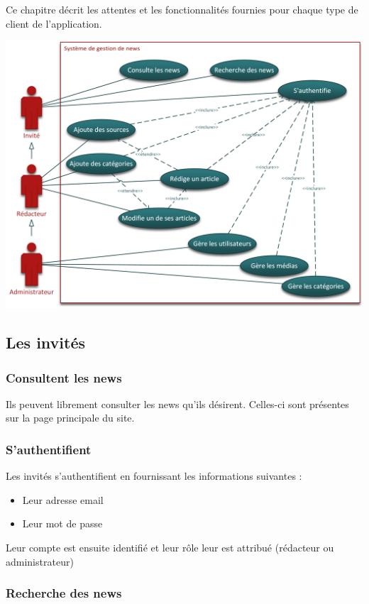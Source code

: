 \documentclass{article}
\begin{document}
Ce chapitre décrit les attentes et les fonctionnalités fournies pour chaque type de client de l’application.

\includegraphics[width=\textwidth]{use_cases}


\subsection{Les invités}

\subsubsection{Consultent les news}

Ils peuvent librement consulter les news qu'ils désirent. Celles-ci sont présentes sur la page principale du site.

\subsubsection{S'authentifient}

Les invités s'authentifient en fournissant les informations suivantes :
\begin{itemize}
\item Leur adresse email
\item Leur mot de passe
\end{itemize}

Leur compte est ensuite identifié et leur rôle leur est attribué (rédacteur ou administrateur)

\subsubsection{Recherche des news}
\end{document}
